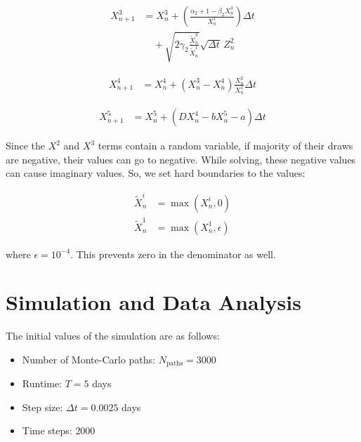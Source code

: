 \documentclass[conference]{IEEEtran}
\renewcommand{\bigskip}{\vspace{2\baselineskip}}
\renewcommand{\smallskip}{\vspace{0.5\baselineskip}}
\theoremstyle{definitionsc}
\theoremstyle{plainsc}
\theoremstyle{remarksc}
\begin{document}
\begin{equation}
\begin{aligned}
    X_{n+1}^3
&=
X_n^3+
\left(
\frac{\alpha_2+1-\beta_2X_n^3}{X_n^1}
\right)\Delta t
\\
&\quad+
\sqrt{
2\gamma_2\frac{\widetilde{X}_n^3}{\widetilde{X}_n^1}
}
\sqrt{\Delta t}\,Z_n^2
\end{aligned}
\end{equation}



\begin{align}
	X_{n+1}^4
&=
X_n^4+
(X_n^3-X_n^4)
\frac{X_n^2}{X_n^1}\Delta t
\end{align}




\begin{align}
	X_{n+1}^5 &= X_n^5 + \left( D X_n^4 - b X_n^5 - a \right) \Delta t
\end{align}



\smallskip


Since the $X^2$ and $X^3$ terms contain a random variable, if majority of their draws are negative, their values can go to negative. While solving, these negative values can cause imaginary values. So, we set hard boundaries to the values:

\begin{align*}
	\widetilde{X}_n^i&=\max(X_n^i,0)\\
\widetilde{X}_n^1&=\max(X_n^1,\epsilon)
\end{align*}

\smallskip

where $\epsilon = 10^{-4}$. This prevents zero in the denominator as well.







\bigskip








\section{Simulation and Data Analysis\label{section4}}

The initial values of the simulation are as follows:
\smallskip

\begin{itemize}
	\item Number of Monte-Carlo paths: $N_{\text{paths}} = 3000$
	\item Runtime: $T = 5$ days
	\item Step size: $\Delta t = 0.0025$ days
	\item Time steps: $2000$
\end{itemize}
\end{document}
